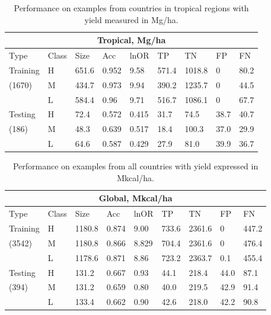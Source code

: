 \documentclass[12pt,twoside]{article}
\begin{document}
\begin{table}[h!]
\centering
\begin{tabular}{lllllllll}
\toprule
\multicolumn{9}{c}{\textbf{Tropical, Mg/ha}} \\
\midrule
Type & Class & Size & Acc & lnOR & TP & TN & FP & FN \\
\midrule
Training & H & 651.6 & 0.952 & 9.58 & 571.4 & 1018.8 & 0 & 80.2  \\
(1670) & M & 434.7 & 0.973 & 9.94 & 390.2 & 1235.7 & 0 & 44.5  \\
& L & 584.4 & 0.96 & 9.71 & 516.7 & 1086.1 & 0 & 67.7  \\
Testing & H & 72.4 & 0.572 & 0.415 & 31.7 & 74.5 & 38.7 & 40.7  \\
(186) & M & 48.3 & 0.639 & 0.517 & 18.4 & 100.3 & 37.0 & 29.9  \\
& L & 64.6 & 0.587 & 0.429 & 27.9 & 81.0 & 39.9 & 36.7  \\
\bottomrule
\end{tabular}
\captionsetup{width=.85\textwidth}
\caption[Performance on Tropical Data with Yield in Mg/ha]{Performance on examples from countries in tropical regions with yield measured in Mg/ha.}
\label{t.ny.trop_results}
\end{table}

\begin{table}[h!]
\centering
\begin{tabular}{lllllllll}
\toprule
\multicolumn{9}{c}{\textbf{Global, Mkcal/ha}} \\
\midrule
Type & Class & Size & Acc & lnOR & TP & TN & FP & FN \\
\midrule
Training & H & 1180.8 & 0.874 & 9.00 & 733.6 & 2361.6 & 0 & 447.2  \\
(3542) & M & 1180.8 & 0.866 & 8.829 & 704.4 & 2361.6 & 0 & 476.4  \\
& L & 1178.6 & 0.871 & 8.86 & 723.2 & 2363.7 & 0.1 & 455.4  \\
Testing & H & 131.2 & 0.667 & 0.93 & 44.1 & 218.4 & 44.0 & 87.1  \\
(394) & M & 131.2 & 0.659 & 0.80 & 40.0 & 219.5 & 42.9 & 91.4  \\
& L & 133.4 & 0.662 & 0.90 & 42.6 & 218.0 & 42.2 & 90.8  \\
\bottomrule
\end{tabular}
\captionsetup{width=.85\textwidth}
\caption[Performance on Global Data with yield in Mkcal/ha]{Performance on examples from all countries with yield expressed in Mkcal/ha.}
\label{k.ny.wt_results}
\end{table}
\clearpage
\end{document}
